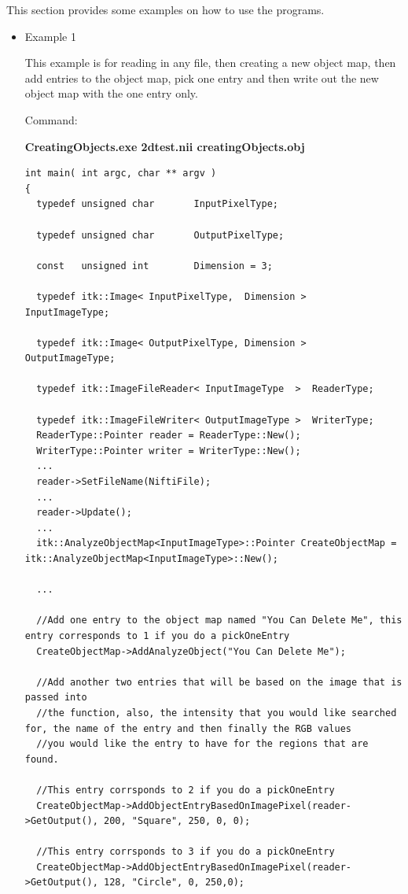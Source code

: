 \documentclass{InsightArticle}
\begin{document}
This section provides some examples on how to use the programs.
\begin{itemize}
\item Example 1 

This example is for reading in any file, then creating a new object map, then add entries to the object map, pick one entry and then write out the new object map with the one entry only.


Command:

\textbf{CreatingObjects.exe 2dtest.nii creatingObjects.obj}\\


\small \begin{verbatim}
int main( int argc, char ** argv )
{
  typedef unsigned char       InputPixelType;
  
  typedef unsigned char       OutputPixelType;
  
  const   unsigned int        Dimension = 3;
  
  typedef itk::Image< InputPixelType,  Dimension >    InputImageType;
  
  typedef itk::Image< OutputPixelType, Dimension >    OutputImageType;
  
  typedef itk::ImageFileReader< InputImageType  >  ReaderType;
  
  typedef itk::ImageFileWriter< OutputImageType >  WriterType;
  ReaderType::Pointer reader = ReaderType::New();
  WriterType::Pointer writer = WriterType::New();
  ...
  reader->SetFileName(NiftiFile);
  ...
  reader->Update();
  ...
  itk::AnalyzeObjectMap<InputImageType>::Pointer CreateObjectMap = itk::AnalyzeObjectMap<InputImageType>::New();
  
  ...
  
  //Add one entry to the object map named "You Can Delete Me", this entry corresponds to 1 if you do a pickOneEntry
  CreateObjectMap->AddAnalyzeObject("You Can Delete Me");

  //Add another two entries that will be based on the image that is passed into 
  //the function, also, the intensity that you would like searched for, the name of the entry and then finally the RGB values
  //you would like the entry to have for the regions that are found.

  //This entry corrsponds to 2 if you do a pickOneEntry
  CreateObjectMap->AddObjectEntryBasedOnImagePixel(reader->GetOutput(), 200, "Square", 250, 0, 0);

  //This entry corrsponds to 3 if you do a pickOneEntry
  CreateObjectMap->AddObjectEntryBasedOnImagePixel(reader->GetOutput(), 128, "Circle", 0, 250,0);


\end{verbatim}
\end{itemize}
\end{document}
